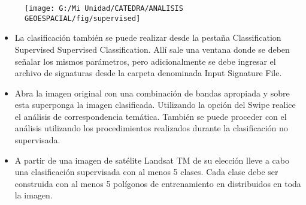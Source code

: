 \documentclass[a4paper,oneside,11pt,]{article}
\begin{document}
\begin{figure}
\centering
\texttt{[image: G:/Mi Unidad/CATEDRA/ANALISIS GEOESPACIAL/fig/supervised]}
\end{figure}

\begin{itemize}
\item La clasificación también se puede realizar desde la pestaña Classification \textrightarrow Supervised \textrightarrow Supervised Classification. Allí sale una ventana donde se deben señalar los mismos parámetros, pero adicionalmente se debe ingresar el archivo de signaturas desde la carpeta denominada Input Signature File.
\item Abra la imagen original con una combinación de bandas apropiada y sobre esta superponga la imagen clasificada. Utilizando la opción del Swipe realice el análisis de correspondencia temática. También se puede proceder con el análisis utilizando los procedimientos realizados durante la clasificación no supervisada.
\item A partir de una imagen de satélite Landsat TM de su elección lleve a cabo una clasificación supervisada con al menos 5 clases.  Cada clase debe ser construida con al menos 5 polígonos de entrenamiento en distribuidos en toda la imagen.
\end{itemize}
\end{document}
